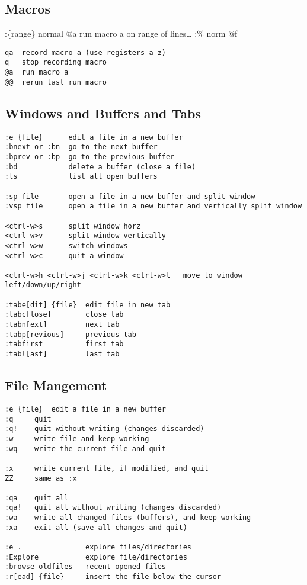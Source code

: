 \documentclass{article}
\begin{document}
\subsection{Macros}\label{macros}

:\{range\} normal @a run macro a on range of lines\ldots{} :\% norm @f

\begin{verbatim}
qa  record macro a (use registers a-z)
q   stop recording macro
@a  run macro a
@@  rerun last run macro
\end{verbatim}

\newpage

\subsection{Windows and Buffers and
Tabs}\label{windows-and-buffers-and-tabs}

\begin{verbatim}
:e {file}      edit a file in a new buffer
:bnext or :bn  go to the next buffer
:bprev or :bp  go to the previous buffer
:bd            delete a buffer (close a file)
:ls            list all open buffers

:sp file       open a file in a new buffer and split window
:vsp file      open a file in a new buffer and vertically split window

<ctrl-w>s      split window horz
<ctrl-w>v      split window vertically
<ctrl-w>w      switch windows
<ctrl-w>c      quit a window

<ctrl-w>h <ctrl-w>j <ctrl-w>k <ctrl-w>l   move to window left/down/up/right 

:tabe[dit] {file}  edit file in new tab
:tabc[lose]        close tab
:tabn[ext]         next tab
:tabp[revious]     previous tab
:tabfirst          first tab
:tabl[ast]         last tab
\end{verbatim}

\subsection{File Mangement}\label{file-mangement}

\begin{verbatim}
:e {file}  edit a file in a new buffer
:q     quit
:q!    quit without writing (changes discarded)
:w     write file and keep working
:wq    write the current file and quit

:x     write current file, if modified, and quit
ZZ     same as :x

:qa    quit all
:qa!   quit all without writing (changes discarded)
:wa    write all changed files (buffers), and keep working
:xa    exit all (save all changes and quit)

:e .               explore files/directories
:Explore           explore file/directories
:browse oldfiles   recent opened files
:r[ead] {file}     insert the file below the cursor
\end{verbatim}
\end{document}
